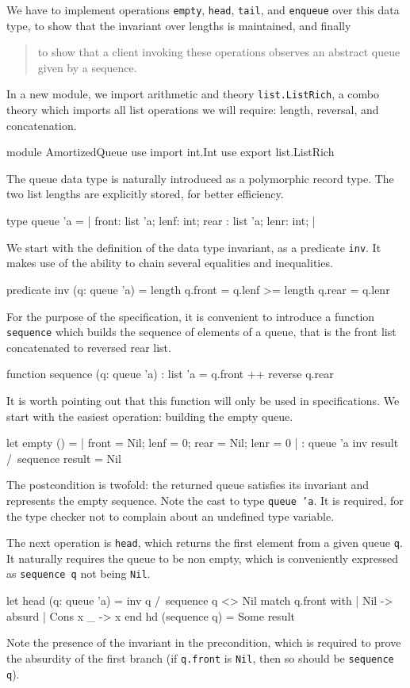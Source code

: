 We have to implement operations \texttt{empty}, \texttt{head},
\texttt{tail}, and \texttt{enqueue} over this data type,
to show that the invariant over lengths is maintained, and finally
\begin{quote}
  to show that a client invoking these operations
  observes an abstract queue given by a sequence.
\end{quote}
In a new module, we import arithmetic and theory
\texttt{list.ListRich}, a combo theory which imports all list
operations we will require: length, reversal, and concatenation.
\begin{whycode}
module AmortizedQueue
  use import int.Int
  use export list.ListRich
\end{whycode}
The queue data type is naturally introduced as a polymorphic record type.
The two list lengths are explicitly stored, for better efficiency.
\begin{whycode}
  type queue 'a = {| front: list 'a; lenf: int;
                     rear : list 'a; lenr: int; |}
\end{whycode}
We start with the definition of the data type invariant, as a
predicate \texttt{inv}. It makes use of the ability to chain
several equalities and inequalities.
\begin{whycode}
  predicate inv (q: queue 'a) =
    length q.front = q.lenf >= length q.rear = q.lenr
\end{whycode}
For the purpose of the specification, it is convenient to introduce a function
\texttt{sequence} which builds the sequence of elements of a queue, that
is the front list concatenated to reversed rear list.
\begin{whycode}
  function sequence (q: queue 'a) : list 'a =
    q.front ++ reverse q.rear
\end{whycode}
It is worth pointing out that this function will only be used in
specifications.
We start with the easiest operation: building the empty queue.
\begin{whycode}
  let empty () =
    {}
    {| front = Nil; lenf = 0; rear = Nil; lenr = 0 |} : queue 'a
    { inv result /\ sequence result = Nil }
\end{whycode}
The postcondition is twofold: the returned queue satisfies its
invariant and represents the empty sequence.
Note the cast to type \texttt{queue 'a}. It is required, for the
type checker not to complain about an undefined type variable.

The next operation is \texttt{head}, which returns the first element from
a given queue \texttt{q}. It naturally requires the queue to be non
empty, which is conveniently expressed as \texttt{sequence q} not
being \texttt{Nil}.
\begin{whycode}
  let head (q: queue 'a) =
    { inv q /\ sequence q <> Nil }
    match q.front with
      | Nil      -> absurd
      | Cons x _ -> x
    end
    { hd (sequence q) = Some result }
\end{whycode}
Note the presence of the invariant in the precondition, which is
required to prove the absurdity of the first branch (if
\texttt{q.front} is \texttt{Nil}, then so should be \texttt{sequence q}).

